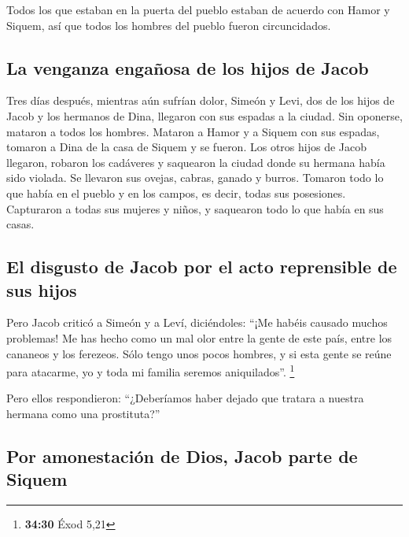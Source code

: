  Todos los que estaban en la puerta del pueblo estaban de
acuerdo con Hamor y Siquem, así que todos los hombres del pueblo fueron
circuncidados.

\hypertarget{la-venganza-engauxf1osa-de-los-hijos-de-jacob}{%
\subsection{La venganza engañosa de los hijos de
Jacob}\label{la-venganza-engauxf1osa-de-los-hijos-de-jacob}}

 Tres días después, mientras aún sufrían dolor, Simeón y
Levi, dos de los hijos de Jacob y los hermanos de Dina, llegaron con sus
espadas a la ciudad. Sin oponerse, mataron a todos los hombres.
 Mataron a Hamor y a Siquem con sus espadas, tomaron a
Dina de la casa de Siquem y se fueron.  Los otros hijos
de Jacob llegaron, robaron los cadáveres y saquearon la ciudad donde su
hermana había sido violada.  Se llevaron sus ovejas,
cabras, ganado y burros. Tomaron todo lo que había en el pueblo y en los
campos,  es decir, todas sus posesiones. Capturaron a
todas sus mujeres y niños, y saquearon todo lo que había en sus casas.

\hypertarget{el-disgusto-de-jacob-por-el-acto-reprensible-de-sus-hijos}{%
\subsection{El disgusto de Jacob por el acto reprensible de sus
hijos}\label{el-disgusto-de-jacob-por-el-acto-reprensible-de-sus-hijos}}

 Pero Jacob criticó a Simeón y a Leví, diciéndoles: ``¡Me
habéis causado muchos problemas! Me has hecho como un mal olor entre la
gente de este país, entre los cananeos y los ferezeos. Sólo tengo unos
pocos hombres, y si esta gente se reúne para atacarme, yo y toda mi
familia seremos aniquilados''. \footnote{\textbf{34:30} Éxod 5,21}

 Pero ellos respondieron: ``¿Deberíamos haber dejado que
tratara a nuestra hermana como una prostituta?''

\hypertarget{por-amonestaciuxf3n-de-dios-jacob-parte-de-siquem}{%
\subsection{Por amonestación de Dios, Jacob parte de
Siquem}\label{por-amonestaciuxf3n-de-dios-jacob-parte-de-siquem}}

